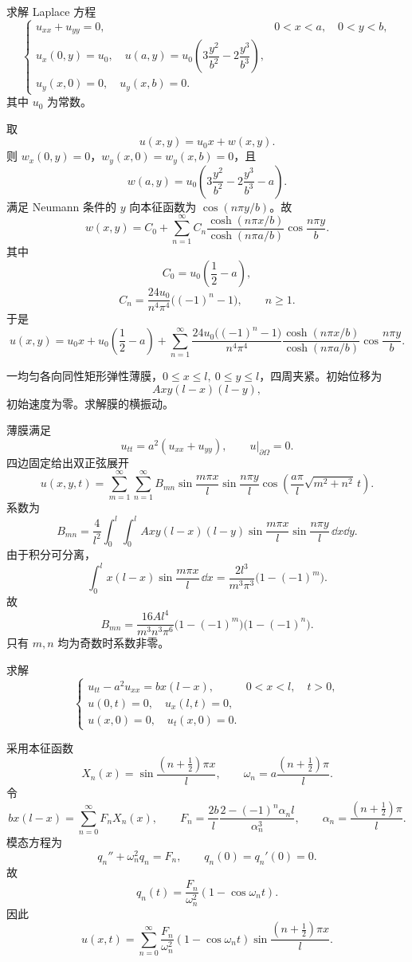 \begin{question}
求解 Laplace 方程
\[
\begin{cases}
u_{xx}+u_{yy}=0,&0<x<a,
\quad 0<y<b,\\
u_x(0,y)=u_0,
\quad u(a,y)=u_0\left(3\dfrac{y^2}{b^2}-2\dfrac{y^3}{b^3}\right),\\
u_y(x,0)=0,
\quad u_y(x,b)=0.
\end{cases}
\]
其中 \(u_0\) 为常数。
\begin{solution}
取
\[
u(x,y)=u_0x+w(x,y).
\]
则 \(w_x(0,y)=0\)，\(w_y(x,0)=w_y(x,b)=0\)，且
\[
w(a,y)=u_0\left(3\frac{y^2}{b^2}-2\frac{y^3}{b^3}-a\right).
\]
满足 Neumann 条件的 \(y\) 向本征函数为 \(\cos(n\pi y/b)\)。故
\[
w(x,y)=C_0+\sum_{n=1}^{\infty}C_n
\frac{\cosh(n\pi x/b)}{\cosh(n\pi a/b)}\cos\frac{n\pi y}{b}.
\]
其中
\[
C_0=u_0\left(\frac12-a\right),
\]
\[
C_n=\frac{24u_0}{n^4\pi^4}\bigl((-1)^n-1\bigr),\qquad n\ge1.
\]
于是
\[
u(x,y)=u_0x+u_0\left(\frac12-a\right)
+\sum_{n=1}^{\infty}
\frac{24u_0\bigl((-1)^n-1\bigr)}{n^4\pi^4}
\frac{\cosh(n\pi x/b)}{\cosh(n\pi a/b)}
\cos\frac{n\pi y}{b}.
\]
\end{solution}
\end{question}

\begin{question}
一均匀各向同性矩形弹性薄膜，\(0\le x\le l,\ 0\le y\le l\)，四周夹紧。初始位移为
\[
Axy(l-x)(l-y),
\]
初始速度为零。求解膜的横振动。
\begin{solution}
薄膜满足
\[
u_{tt}=a^2(u_{xx}+u_{yy}),\qquad u|_{\partial\Omega}=0.
\]
四边固定给出双正弦展开
\[
u(x,y,t)=\sum_{m=1}^{\infty}\sum_{n=1}^{\infty}B_{mn}
\sin\frac{m\pi x}{l}\sin\frac{n\pi y}{l}
\cos\left(\frac{a\pi}{l}\sqrt{m^2+n^2}\,t\right).
\]
系数为
\[
B_{mn}=\frac{4}{l^2}\int_0^l\int_0^l
Axy(l-x)(l-y)
\sin\frac{m\pi x}{l}\sin\frac{n\pi y}{l}\,\dd{x}\dd{y}.
\]
由于积分可分离，
\[
\int_0^l x(l-x)\sin\frac{m\pi x}{l}\,\dd{x}
=\frac{2l^3}{m^3\pi^3}\bigl(1-(-1)^m\bigr).
\]
故
\[
B_{mn}=\frac{16Al^4}{m^3n^3\pi^6}
\bigl(1-(-1)^m\bigr)\bigl(1-(-1)^n\bigr).
\]
只有 \(m,n\) 均为奇数时系数非零。
\end{solution}
\end{question}

\begin{question}
求解
\[
\begin{cases}
u_{tt}-a^2u_{xx}=b x(l-x),&0<x<l,
\quad t>0,\\
u(0,t)=0,
\quad u_x(l,t)=0,\\
u(x,0)=0,
\quad u_t(x,0)=0.
\end{cases}
\]
\begin{solution}
采用本征函数
\[
X_n(x)=\sin\frac{(n+\frac12)\pi x}{l},
\qquad
\omega_n=a\frac{(n+\frac12)\pi}{l}.
\]
令
\[
bx(l-x)=\sum_{n=0}^{\infty}F_nX_n(x),
\qquad
F_n=\frac{2b}{l}\frac{2-(-1)^n\alpha_nl}{\alpha_n^3},
\qquad
\alpha_n=\frac{(n+\frac12)\pi}{l}.
\]
模态方程为
\[
q_n''+\omega_n^2q_n=F_n,
\qquad q_n(0)=q_n'(0)=0.
\]
故
\[
q_n(t)=\frac{F_n}{\omega_n^2}(1-\cos\omega_nt).
\]
因此
\[
u(x,t)=\sum_{n=0}^{\infty}\frac{F_n}{\omega_n^2}
(1-\cos\omega_nt)
\sin\frac{(n+\frac12)\pi x}{l}.
\]
\end{solution}
\end{question}

